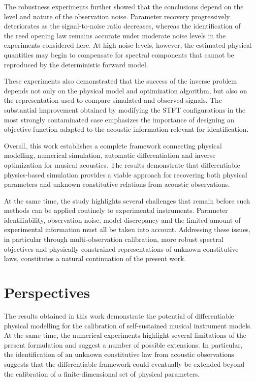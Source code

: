 \documentclass[11pt,a4paper]{report}
\theoremstyle{plain}
\theoremstyle{definition}
\begin{document}
The robustness experiments further showed that the conclusions depend on the
level and nature of the observation noise. Parameter recovery progressively
deteriorates as the signal-to-noise ratio decreases, whereas the identification
of the reed opening law remains accurate under moderate noise levels in the
experiments considered here. At high noise levels, however, the estimated
physical quantities may begin to compensate for spectral components that
cannot be reproduced by the deterministic forward model.

These experiments also demonstrated that the success of the inverse problem
depends not only on the physical model and optimization algorithm, but also on
the representation used to compare simulated and observed signals. The
substantial improvement obtained by modifying the STFT configurations in the
most strongly contaminated case emphasizes the importance of designing an
objective function adapted to the acoustic information relevant for
identification.

Overall, this work establishes a complete framework connecting physical
modelling, numerical simulation, automatic differentiation and inverse
optimization for musical acoustics. The results demonstrate that differentiable
physics-based simulation provides a viable approach for recovering both
physical parameters and unknown constitutive relations from acoustic
observations.

At the same time, the study highlights several challenges that remain before
such methods can be applied routinely to experimental instruments. Parameter
identifiability, observation noise, model discrepancy and the limited amount
of experimental information must all be taken into account. Addressing these
issues, in particular through multi-observation calibration, more robust
spectral objectives and physically constrained representations of unknown
constitutive laws, constitutes a natural continuation of the present work.

\chapter{Perspectives}
\label{chap:perspectives}
\minitoc

The results obtained in this work demonstrate the potential of differentiable
physical modelling for the calibration of self-sustained musical instrument
models. At the same time, the numerical experiments highlight several
limitations of the present formulation and suggest a number of possible
extensions. In particular, the identification of an unknown constitutive law
from acoustic observations suggests that the differentiable framework could
eventually be extended beyond the calibration of a finite-dimensional set of
physical parameters.
\end{document}
